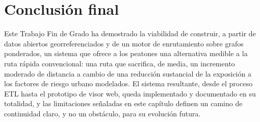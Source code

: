 \section{Conclusión final}
\label{sec:conclusion_final}

Este Trabajo Fin de Grado ha demostrado la viabilidad de construir, a partir de datos abiertos georreferenciados y de un motor de enrutamiento sobre grafos ponderados, un sistema que ofrece a los peatones una alternativa medible a la ruta rápida convencional: una ruta que sacrifica, de media, un incremento moderado de distancia a cambio de una reducción sustancial de la exposición a los factores de riesgo urbano modelados. El sistema resultante, desde el proceso ETL hasta el prototipo de visor web, queda implementado y documentado en su totalidad, y las limitaciones señaladas en este capítulo definen un camino de continuidad claro, y no un obstáculo, para su evolución futura.
